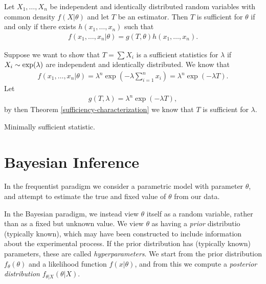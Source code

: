 \begin{thm}\label{sufficiency-characterization}
    Let $X_1, \ldots, X_n$ be independent and identically distributed random variables with common density $f(X|\theta)$ and let $T$ be an estimator. Then $T$ is sufficient for $\theta$ if and only if there exists $h(x_1, \ldots, x_n)$ such that
    \begin{align*}
        f(x_1, \ldots, x_n|\theta) = g(T, \theta)h(x_1, \ldots, x_n).
    \end{align*}
\end{thm}

\begin{exmp}
    Suppose we want to show that $T = \sum X_i$ is a sufficient statistics for $\lambda$ if $X_i \sim \textrm{exp}(\lambda)$ are independent and identically distributed. We know that
    \begin{align*}
        f(x_1, \ldots, x_n|\theta) = \lambda^n\exp\left(-\lambda\sum_{i=1}^{n}x_i\right) = \lambda^n\exp\left(-\lambda T\right).
    \end{align*}
    Let
    \begin{align*}
        g(T,\lambda) = \lambda^n\exp\left(-\lambda T\right),
    \end{align*}
    by then Theorem \ref{sufficiency-characterization} we know that $T$ is sufficient for $\lambda$.
\end{exmp}

\begin{defn}
    Minimally sufficient statistic.
\end{defn}

\section{Bayesian Inference}

\begin{rmk}
    In the frequentist paradigm we consider a parametric model with parameter $\theta$, and attempt to estimate the true and fixed value of $\theta$ from our data.

    In the Bayesian paradigm, we instead view $\theta$ itself as a random variable, rather than as a fixed but unknown value. We view $\theta$ as having a \emph{prior} distributio (typically known), which may have been constructed to include information about the experimental process. If the prior distribution has (typically known) parameters, these are called \emph{hyperparameters}. We start from the prior distribution $f_{\theta}(\theta)$ and a likelihood function $f(x|\theta)$, and from this we compute a \emph{posterior distribution} $f_{\theta|X}(\theta|X)$.
\end{rmk}

